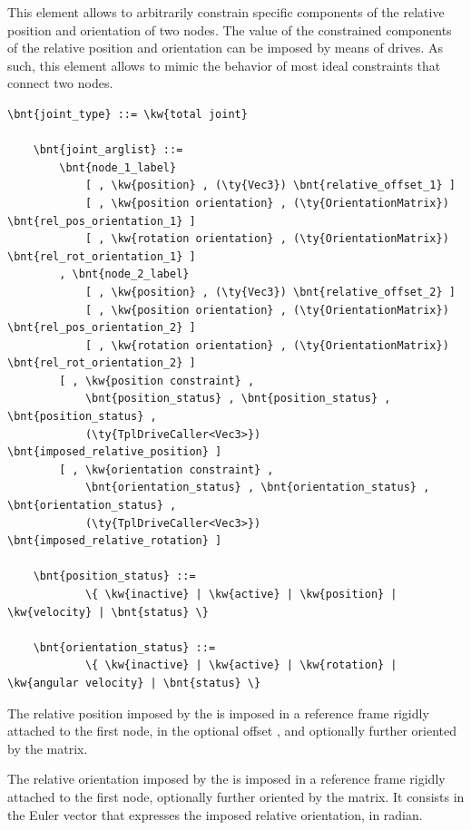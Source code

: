 This element allows to arbitrarily constrain specific components
of the relative position and orientation of two nodes.
The value of the constrained components of the relative position
and orientation can be imposed by means of drives.
As such, this element allows to mimic the behavior of most
ideal constraints that connect two nodes.
\begin{Verbatim}[commandchars=\\\{\}]
    \bnt{joint_type} ::= \kw{total joint}

    \bnt{joint_arglist} ::=
        \bnt{node_1_label}
            [ , \kw{position} , (\ty{Vec3}) \bnt{relative_offset_1} ]
            [ , \kw{position orientation} , (\ty{OrientationMatrix}) \bnt{rel_pos_orientation_1} ]
            [ , \kw{rotation orientation} , (\ty{OrientationMatrix}) \bnt{rel_rot_orientation_1} ]
        , \bnt{node_2_label}
            [ , \kw{position} , (\ty{Vec3}) \bnt{relative_offset_2} ]
            [ , \kw{position orientation} , (\ty{OrientationMatrix}) \bnt{rel_pos_orientation_2} ]
            [ , \kw{rotation orientation} , (\ty{OrientationMatrix}) \bnt{rel_rot_orientation_2} ]
        [ , \kw{position constraint} ,
            \bnt{position_status} , \bnt{position_status} , \bnt{position_status} ,
            (\ty{TplDriveCaller<Vec3>}) \bnt{imposed_relative_position} ]
        [ , \kw{orientation constraint} ,
            \bnt{orientation_status} , \bnt{orientation_status} , \bnt{orientation_status} ,
            (\ty{TplDriveCaller<Vec3>}) \bnt{imposed_relative_rotation} ]

    \bnt{position_status} ::=
            \{ \kw{inactive} | \kw{active} | \kw{position} | \kw{velocity} | \bnt{status} \}

    \bnt{orientation_status} ::=
            \{ \kw{inactive} | \kw{active} | \kw{rotation} | \kw{angular velocity} | \bnt{status} \}
\end{Verbatim}
The relative position imposed by the 
is imposed in a reference frame rigidly attached to the first node,
in the optional offset ,
and optionally further oriented by the 
matrix.

The relative orientation imposed by the 
is imposed in a reference frame rigidly attached to the first node,
optionally further oriented by the 
matrix.
It consists in the Euler vector that expresses
the imposed relative orientation, in radian.

